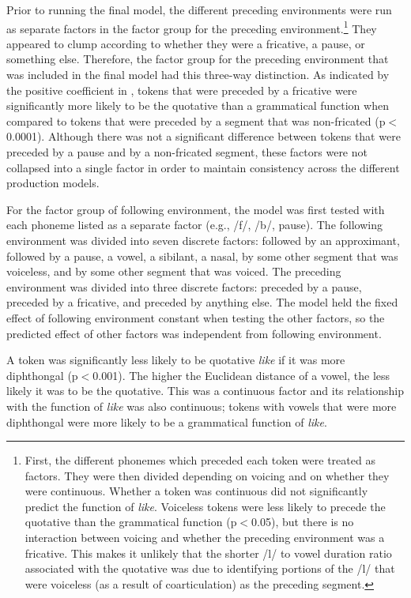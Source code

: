 Prior to running the final model, the different preceding environments were run as separate factors in the factor group for the preceding environment.\footnote{First, the different phonemes which preceded each token were treated as factors. They were then divided depending on voicing and on whether they were continuous. Whether a token was continuous did not significantly predict the function of \textit{like}. Voiceless tokens were less likely to precede the quotative than the grammatical function (p$<$0.05), but there is no interaction between voicing and whether the preceding environment was a fricative. This makes it unlikely that the shorter /l/ to vowel duration ratio associated with the quotative was due to identifying portions of the /l/ that were voiceless (as a result of coarticulation) as the preceding segment.} They appeared to clump according to whether they were a fricative, a pause, or something else. Therefore, the factor group for the preceding environment that was included in the final model had this three-way distinction. As indicated by the positive coefficient in , tokens that were preceded by a fricative were significantly more likely to be the quotative than a grammatical function when compared to tokens that were preceded by a segment that was non-fricated (p$<$0.0001). Although there was not a significant difference between tokens that were preceded by a pause and by a non-fricated segment, these factors were not collapsed into a single factor in order to maintain consistency across the different production models.

For the factor group of following environment, the model was first tested with each phoneme listed as a separate factor (e.g., /f/, /b/, pause). The following environment was divided into seven discrete factors: followed by an approximant, followed by a pause, a vowel, a sibilant, a nasal, by some other segment that was voiceless, and by some other segment that was voiced. The preceding environment was divided into three discrete factors: preceded by a pause, preceded by a fricative, and preceded by anything else. The model held the fixed effect of following environment constant when testing the other factors, so the predicted effect of other factors was independent from following environment. 

A token was significantly less likely to be quotative \textit{like} if it was more diphthongal (p$<$0.001). The higher the Euclidean distance of a vowel, the less likely it was to be the quotative. This was a continuous factor and its relationship with the function of \textit{like} was also continuous; tokens with vowels that were more diphthongal were more likely to be a grammatical function of \textit{like}.  

